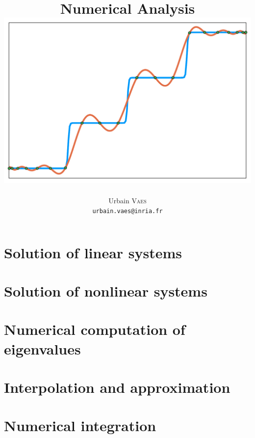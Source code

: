 \documentclass[11pt,a4paper,oneside]{book}
\title{\vspace{-1cm}\textbf{Numerical Analysis} \\[1cm]
    \includegraphics[width=.7\textwidth]{figures/chebychev_cover.pdf}
}
\author{%
    Urbain \textsc{Vaes} \\
    \texttt{urbain.vaes@inria.fr}
}
\date{\vspace{1cm} {\large\textsc{NYU Paris}, Spring term 2022} \\[2cm]
    \vfill
    \flushleft \textbf{Weekly schedule}:
    \begin{itemize}
        \item Lectures on Tuesday and Thursday afternoon (2 $\times$ 1h15);
        \item Recitation on Thursday afternoon (1h30);
        \item Office hour on Tuesday, after the lecture.
    \end{itemize}
}
\begin{document}
\maketitle

\frontmatter

\tableofcontents

\mainmatter


\dominitoc%


\chapter{Solution of linear systems}
\label{cha:solution_of_linear_systems}

\chapter{Solution of nonlinear systems}
\label{cha:solution_of_nonlinear_systems}

\chapter{Numerical computation of eigenvalues}%
\label{cha:numerical_computation_of_eigenvalues}

\chapter{Interpolation and approximation}%
\label{cha:interpolation_and_approximation}

\chapter{Numerical integration}
\label{cha:quadrature}

\nocite{*}
\printbibliography
\end{document}

